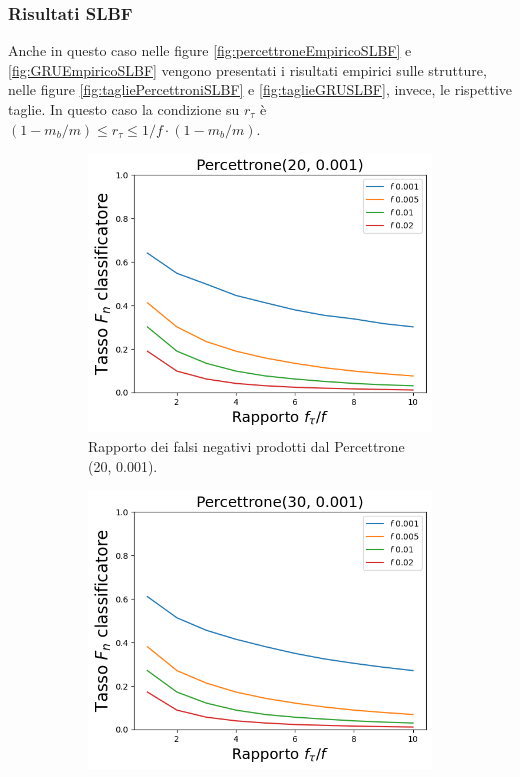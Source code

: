 \documentclass[../../main.tex]{subfiles}
\begin{document}
    \subsubsection{Risultati SLBF}
    Anche in questo caso nelle figure \ref{fig:percettroneEmpiricoSLBF} e \ref{fig:GRUEmpiricoSLBF} vengono presentati i risultati empirici sulle strutture, nelle figure \ref{fig:tagliePercettroniSLBF} e \ref{fig:taglieGRUSLBF}, invece, le rispettive taglie. In questo caso la condizione su $r_{\tau}$ è $(1 - m_b/m) \leq r_{\tau} \leq 1/f \cdot \left(1 - m_b/m\right)$.
    \begin{figure}[H]
        \centering
        \begin{subfigure}[b]{0.49\textwidth}
            \centering
            \includegraphics[width = \textwidth]{immagini/7/SLBF/Percettrone(20, 0.001)_FNR.png}
            \caption{Rapporto dei falsi negativi prodotti dal Percettrone (20, 0.001).}
            \label{fig:SLBFFNRPercettrone20}
        \end{subfigure}
        \begin{subfigure}[b]{0.49\textwidth}
            \centering
            \includegraphics[width = \textwidth]{immagini/7/SLBF/Percettrone(30, 0.001)_FNR.png}

\end{subfigure}
\end{figure}
\end{document}
